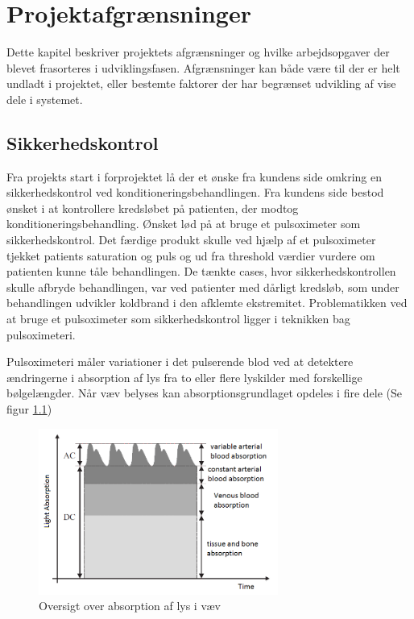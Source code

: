 \chapter{Projektafgrænsninger}
Dette kapitel beskriver projektets afgrænsninger og hvilke arbejdsopgaver der blevet frasorteres i udviklingsfasen. Afgrænsninger kan både være til der er helt undladt i projektet, eller bestemte faktorer der har begrænset udvikling af vise dele i systemet. 

\section{Sikkerhedskontrol} \label{title:sikkerhedskontrol}
Fra projekts start i forprojektet lå der et ønske fra kundens side omkring en sikkerhedskontrol ved konditioneringsbehandlingen. Fra kundens side bestod ønsket i at kontrollere kredsløbet på patienten, der modtog konditioneringsbehandling. Ønsket lød på at bruge et pulsoximeter som sikkerhedskontrol. Det færdige produkt skulle ved hjælp af et pulsoximeter tjekket patients saturation og puls og ud fra threshold værdier vurdere om patienten kunne tåle behandlingen. De tænkte cases, hvor sikkerhedskontrollen skulle afbryde behandlingen, var ved patienter med dårligt kredsløb, som under behandlingen udvikler koldbrand i den afklemte ekstremitet. Problematikken ved at bruge et pulsoximeter som sikkerhedskontrol ligger i teknikken bag pulsoximeteri. 

Pulsoximeteri måler variationer i det pulserende blod ved at detektere ændringerne i absorption af lys fra to eller flere lyskilder med forskellige bølgelængder. Når væv belyses kan absorptionsgrundlaget opdeles i fire dele (Se figur \ref{fig:opticTissue})
\begin{figure}[H]
	\centering
	\includegraphics[width = 0.7\textwidth]{billeder/opticTissue.png}
	\caption{Oversigt over absorption af lys i væv}\label{fig:opticTissue}
\end{figure}

